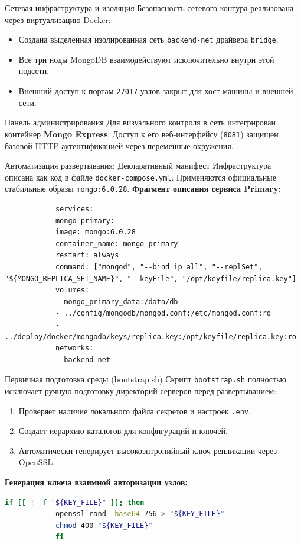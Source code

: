 \documentclass[10pt]{beamer}
\begin{document}
	\begin{frame}{Сетевая инфраструктура и изоляция}
		Безопасность сетевого контура реализована через виртуализацию Docker:
		\vfill
		\begin{itemize}
			\item Создана выделенная изолированная сеть \texttt{backend-net} драйвера \texttt{bridge}.
			\item Все три ноды MongoDB взаимодействуют исключительно внутри этой подсети.
			\item Внешний доступ к портам \texttt{27017} узлов закрыт для хост-машины и внешней сети.
		\end{itemize}
		\vfill
		\begin{block}{Панель администрирования}
			Для визуального контроля в сеть интегрирован контейнер \textbf{Mongo Express}. Доступ к его веб-интерфейсу (\texttt{8081}) защищен базовой HTTP-аутентификацией через переменные окружения.
		\end{block}
	\end{frame}
	
	\begin{frame}[fragile]{Автоматизация развертывания: Декларативный манифест}
		Инфраструктура описана как код в файле \texttt{docker-compose.yml}. Применяются официальные стабильные образы \texttt{mongo:6.0.28}.
		\vfill
		\textbf{Фрагмент описания сервиса Primary:}
		\vfill
		\begin{lstlisting}
			services:
			mongo-primary:
			image: mongo:6.0.28
			container_name: mongo-primary
			restart: always
			command: ["mongod", "--bind_ip_all", "--replSet", "${MONGO_REPLICA_SET_NAME}", "--keyFile", "/opt/keyfile/replica.key"]
			volumes:
			- mongo_primary_data:/data/db
			- ../config/mongodb/mongod.conf:/etc/mongod.conf:ro
			- ../deploy/docker/mongodb/keys/replica.key:/opt/keyfile/replica.key:ro
			networks:
			- backend-net
		\end{lstlisting}
	\end{frame}
	
	\begin{frame}[fragile]{Первичная подготовка среды (bootstrap.sh)}
		Скрипт \texttt{bootstrap.sh} полностью исключает ручную подготовку директорий серверов перед развертыванием:
		\vfill
		\begin{enumerate}
			\item Проверяет наличие локального файла секретов и настроек \texttt{.env}.
			\item Создает иерархию каталогов для конфигураций и ключей.
			\item Автоматически генерирует высокоэнтропийный ключ репликации через OpenSSL.
		\end{enumerate}
		\vfill
		\textbf{Генерация ключа взаимной авторизации узлов:}
		\vfill
		\begin{lstlisting}[language=bash]
			if [[ ! -f "${KEY_FILE}" ]]; then
			openssl rand -base64 756 > "${KEY_FILE}"
			chmod 400 "${KEY_FILE}"
			fi
		\end{lstlisting}
	\end{frame}
	
\end{document}
